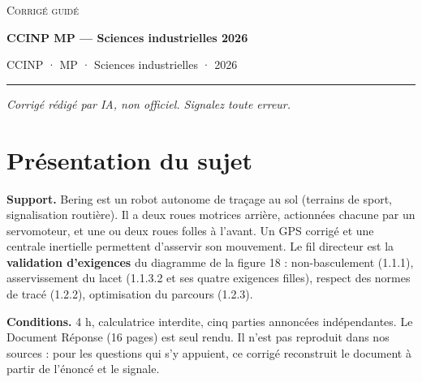 \documentclass[11pt,a4paper]{article}
\begin{document}
\thispagestyle{plain}
\begin{center}
  {\small\scshape Corrigé guidé}\par\smallskip
  {\LARGE\bfseries CCINP MP — Sciences industrielles 2026\par}\medskip
  {\large CCINP · MP · Sciences industrielles · 2026\par}
\end{center}
\vspace{2pt}\hrule\vspace{8pt}

\emph{Corrigé rédigé par IA, non officiel. Signalez toute erreur.}

\hypertarget{pruxe9sentation-du-sujet}{%
\section{Présentation du sujet}\label{pruxe9sentation-du-sujet}}

\textbf{Support.} Bering est un robot autonome de traçage au sol (terrains de sport, signalisation routière). Il a deux roues motrices arrière, actionnées chacune par un servomoteur, et une ou deux roues folles à l'avant. Un GPS corrigé et une centrale inertielle permettent d'asservir son mouvement. Le fil directeur est la \textbf{validation d'exigences} du diagramme de la figure 18 : non-basculement (1.1.1), asservissement du lacet (1.1.3.2 et ses quatre exigences filles), respect des normes de tracé (1.2.2), optimisation du parcours (1.2.3).

\textbf{Conditions.} 4 h, calculatrice interdite, cinq parties annoncées indépendantes. Le Document Réponse (16 pages) est seul rendu. Il n'est pas reproduit dans nos sources : pour les questions qui s'y appuient, ce corrigé reconstruit le document à partir de l'énoncé et le signale.
\end{document}
